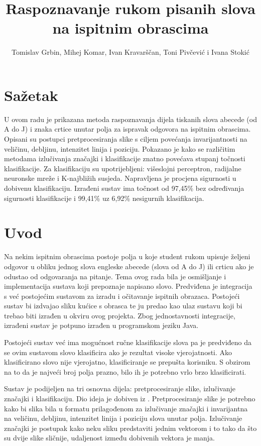 \documentclass[a4paper,twocolumn,dvipdfm]{article}
\begin{document}
\title{Raspoznavanje rukom pisanih slova na ispitnim obrascima} 
\author{Tomislav Grbin, Mihej Komar, Ivan Kravarščan, Toni Pivčević i Ivana Stokić}
\maketitle

\section*{Sažetak}
U ovom radu je prikazana metoda raspoznavanja dijela tiskanih slova abecede (od
A do J) i znaka crtice unutar polja za ispravak odgovora na ispitnim obrascima.
Opisani su postupci pretprocesiranja slike s ciljem povećanja invarijantnosti na
veličinu, debljinu, intenzitet linija i poziciju. Pokazano je kako se
različitim metodama izlučivanja značajki i klasifikacije znatno povećava stupanj
točnosti klasifikacije. Za klasifikaciju su upotrijebljeni: višeslojni
perceptron, radijalne neuronske mreže i K-najbližih susjeda. Napravljena je
procjena sigurnosti u dobivenu klasifikaciju. Izrađeni sustav ima točnost od
97,45\% bez određivanja sigurnosti klasifikacije i 99,41\% uz 6,92\% nesigurnih
klasifikacija.

\section{Uvod}
Na nekim ispitnim obrascima postoje polja u koje student rukom upisuje željeni
odgovor u obliku jednog slova engleske abecede (slova od A do J) ili crticu ako
je odustao od odgovaranja na pitanje. Tema ovog rada bila je osmišljanje i
implementacija sustava koji prepoznaje napisano slovo. Predviđena je integracija
s već postojećim sustavom za izradu i očitavanje ispitnih obrazaca. Postojeći
sustav bi izdvajao sliku kućice s obrasca te ju predao kao ulaz sustavu
koji bi trebao biti izrađen u okviru ovog projekta. Zbog jednostavnosti
integracije, izrađeni sustav je potpuno izrađen u programskom jeziku Java.

Postojeći sustav već ima mogućnost ručne klasifikacije slova pa je predviđeno
da se ovim sustavom slovo klasificira ako je rezultat visoke vjerojatnosti. Ako
klasificirano slovo nije vjerojatno, klasificiranje se prepušta korisniku. S
obzirom na to da je najveći broj polja prazno, bilo ih je potrebno vrlo brzo
klasificirati.

Sustav je podijeljen na tri osnovna dijela: pretprocesiranje slike, izlučivanje
značajki i klasifikaciju. Dio ideja je dobiven iz \cite{vamvakasoptical}.
Pretprocesiranje slike je potrebno kako bi slika bila u formatu prilagođenom za
izlučivanje značajki i invarijantna na veličinu, debljinu, intenzitet linija i
poziciju slova unutar polja. Izlučivanje značajki je postupak kako neku sliku
predstaviti jednim vektorom i to tako da što su dvije slike sličnije, udaljenost
između dobivenih vektora je manja.
\end{document}
